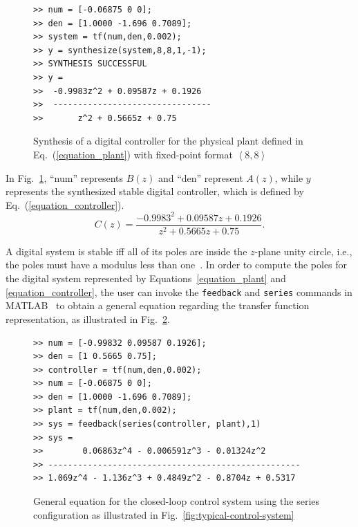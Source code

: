 \documentclass[10pt,conference]{IEEEtran}
\begin{document}
\begin{figure}[ht]
\scriptsize
\begin{lstlisting}[xleftmargin=.025\textwidth,xrightmargin=.025\textwidth, frame=single,basicstyle=\tt]
>> num = [-0.06875 0 0];
>> den = [1.0000 -1.696 0.7089];
>> system = tf(num,den,0.002);
>> y = synthesize(system,8,8,1,-1);
>> SYNTHESIS SUCCESSFUL
>> y = 
>>  -0.9983z^2 + 0.09587z + 0.1926
>>  --------------------------------
>>       z^2 + 0.5665z + 0.75
\end{lstlisting}
\caption{Synthesis of a digital controller for the physical plant
defined in Eq.~(\ref{equation_plant}) with 
fixed-point format $\left\langle 8,8\right\rangle$}
\label{toolbox-usage}
\end{figure}

In Fig.~\ref{toolbox-usage}, ``num'' represents $B(z)$ and ``den'' represent
$A(z)$, while $y$ represents the synthesized stable digital controller,
which is defined by Eq.~(\ref{equation_controller}).
%
\begin{equation}
\label{equation_controller}
C(z)=\frac{-0.9983^{2}+0.09587z+0.1926}{z^2+0.5665z+0.75}.
\end{equation}

A digital system is stable iff all of its poles are inside the
$z$-plane unity circle, i.e., the poles must have a modulus less than
one~\cite{astrom1997computer}.  In order to compute the poles for the
digital system represented by Equations~\eqref{equation_plant} and
\eqref{equation_controller}, the user can invoke the \texttt{feedback} and
\texttt{series} commands in MATLAB~\cite{matlab-toolbox} to obtain a
general equation regarding the transfer function representation, as
illustrated in Fig.~\ref{combine-controller-plant}.

\begin{figure}[ht]
\scriptsize
\begin{lstlisting}[xleftmargin=.025\textwidth,xrightmargin=.025\textwidth, frame=single,basicstyle=\tt]
>> num = [-0.99832 0.09587 0.1926];
>> den = [1 0.5665 0.75];
>> controller = tf(num,den,0.002);
>> num = [-0.06875 0 0];
>> den = [1.0000 -1.696 0.7089];
>> plant = tf(num,den,0.002);
>> sys = feedback(series(controller, plant),1)
>> sys =
>>        0.06863z^4 - 0.006591z^3 - 0.01324z^2
>> ---------------------------------------------------
>> 1.069z^4 - 1.136z^3 + 0.4849z^2 - 0.8704z + 0.5317
\end{lstlisting}
\vspace{-0.2cm}
\caption{General equation for the closed-loop control system using the series configuration as
illustrated in Fig.~\ref{fig:typical-control-system}}
\label{combine-controller-plant}
\end{figure}
\end{document}

